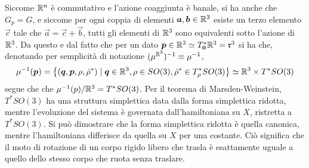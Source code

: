 Siccome $\mathbb{R}^{n}$ è commutativo e l'azione coaggiunta è banale, si ha anche che $G_p = G$, e siccome per ogni coppia di elementi $\boldsymbol{a}, \boldsymbol{b} \in \mathbb{R}^3$ esiste un terzo elemento $\vec{c}$ tale che $\vec{a} = \vec{c} + \vec{b}$, tutti gli elementi di $\mathbb{R}^3$ sono equivalenti sotto l'azione di $\mathbb{R}^3$. Da questo e dal fatto che per un dato $\boldsymbol{p} \in \mathbb{R}^3 \simeq T^*_{\boldsymbol{0}} \mathbb{R}^3 = \mathfrak{r}^3$ si ha che, denotando per semplicità di notazione $(\mu^{\mathbb{R}^3})^{-1} \equiv \mu^{-1}$,
\begin{equation*}
\mu^{-1}(\boldsymbol{p}) = \big\lbrace(\boldsymbol{q},\boldsymbol{p}, \rho, \dot{\rho}^*) \mid \boldsymbol{q}\in \mathbb{R}^3, \rho \in SO(3), \dot{\rho}^* \in T^*_{\rho} SO(3)\big\rbrace \simeq \mathbb{R}^3 \times T^*SO(3)
\end{equation*} 
segue che che $\mu^{-1}(p)/\mathbb{R}^3 = T^*SO(3)$. Per il teorema di Marsden-Weinstein, $T^* SO(3)$ ha una struttura simplettica data dalla forma simplettica ridotta, mentre l'evoluzione del sistema è governata dall'hamiltoniana su $X$, ristretta a $T^* SO(3)$. Si può dimostrare che la forma simplettica ridotta è quella canonica, mentre l'hamiltoniana differisce da quella su $X$ per una costante. Ciò significa che il moto di rotazione di un corpo rigido libero che trasla è esattamente uguale a quello dello stesso corpo che ruota senza traslare.

